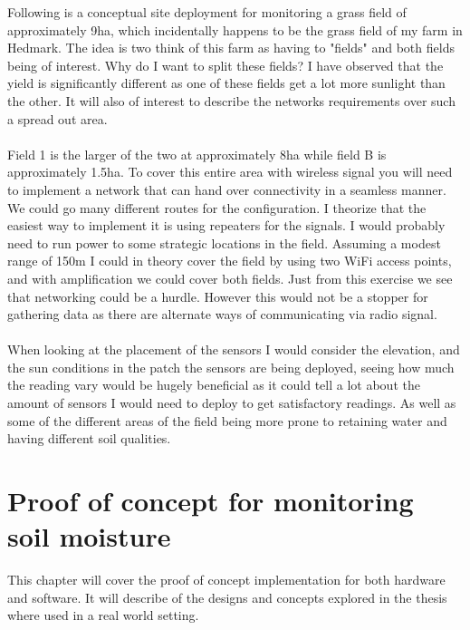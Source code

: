 \documentclass[]{uiophd}
\begin{document}
 Following is a conceptual site deployment for monitoring a grass field of approximately 9ha, which incidentally happens to be the grass field of my farm in Hedmark. The idea is two think of this farm as having to "fields" and both fields being of interest. Why do I want to split these fields? I have observed that the yield is significantly different as one of these fields get a lot more sunlight than the other. It will also of interest to describe the networks requirements over such a spread out area.
 \\\\
 Field 1 is the larger of the two at approximately 8ha while field B is approximately 1.5ha. To cover this entire area with wireless signal you will need to implement a network that can hand over connectivity in a seamless manner. We could go many different routes for the configuration. I theorize that the easiest way to implement it is using repeaters for the signals. I would probably need to run power to some strategic locations in the field. Assuming a modest range of 150m I could in theory cover the field by using two WiFi access points, and with amplification we could cover both fields. Just from this exercise we see that networking could be a hurdle. However this would not be a stopper for gathering data as there are alternate ways of communicating via radio signal.
 \\\\
 When looking at the placement of the sensors I would consider the elevation, and the sun conditions in the patch the sensors are being deployed, seeing how much the reading vary would be hugely beneficial as it could tell a lot about the amount of sensors I would need to deploy to get satisfactory readings. As well as some of the different areas of the field being more prone to retaining water and having different soil qualities. 
 
\chapter{Proof of concept for monitoring soil moisture}

This chapter will cover the proof of concept implementation for both hardware and software. It will describe of the designs and concepts explored in the thesis where used in a real world setting.
\end{document}
